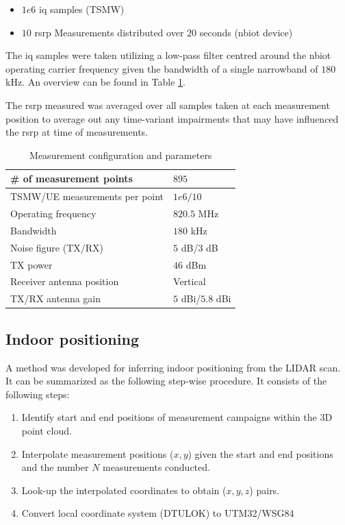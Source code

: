 \begin{itemize}
    \item $1e6$ \gls{iq} samples (TSMW)
    \item $10$ \gls{rsrp} Measurements distributed over $20$ seconds (\gls{nbiot} device)
\end{itemize}


The \gls{iq} samples were taken utilizing a low-pass filter centred around the \gls{nbiot} operating carrier frequency given the bandwidth of a single narrowband of $180$ kHz. An overview can be found in Table \ref{tab:measurement_configuration}. 

The \gls{rsrp} measured was averaged over all samples taken at each measurement position to average out any time-variant impairments that may have influenced the \gls{rsrp} at time of measurements. 

\begin{table}[htbp]
    \centering
    \footnotesize{
    \begin{tabular}{@{}l|l@{}}
    \toprule
    \# of measurement points       & $895$             \\ \midrule
    TSMW/UE measurements per point & $1e6/10$          \\ \midrule
    Operating frequency            & $820.5$ MHz       \\ \midrule
    Bandwidth                      & $180$ kHz         \\ \midrule
    Noise figure (TX/RX)           & $5$ dB/$3$ dB     \\ \midrule
    TX power                       & $46$ dBm          \\ \midrule
    Receiver antenna position      & Vertical          \\ \midrule
    TX/RX antenna gain             & $5$ dBi/$5.8$ dBi \\ \bottomrule
    \end{tabular}
    \caption{Measurement configuration and parameters}\label{tab:measurement_configuration}
    }
\end{table}

\subsection{Indoor positioning}
A method was developed for inferring indoor positioning from the LIDAR scan. It can be summarized as the following step-wise procedure. It consists of the following steps:

\begin{enumerate}
    \item Identify start and end positions of measurement campaigns within the $3$D point cloud.
    \item Interpolate measurement positions ($x, y$) given the start and end positions and the number $N$ measurements conducted.
    \item Look-up the interpolated coordinates to obtain ($x, y, z$) pairs.
    \item Convert local coordinate system (DTULOK) to UTM32/WSG84
\end{enumerate}

